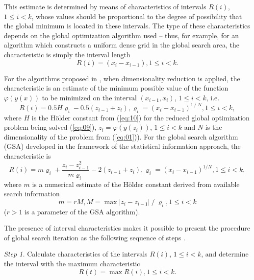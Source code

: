\documentclass[runningheads]{llncs}
\begin{document}
This estimate is determined by means of characteristics of intervals $R(i)$, $1 \leq i<k$, whose values should be proportional to the degree of possibility that the global minimum is located  in these intervals. The type of these characteristics depends on the global optimization algorithm used -- thus, for example, for an algorithm which constructs a uniform dense grid in the global search area, the characteristic is simply the interval length 
\begin{equation}
\label{eq:12}
R(i)=(x_i-x_{i-1}), 1 \leq i<k.
\end{equation}


For the algorithms proposed in \cite{c22,c23}, when dimensionality reduction is applied, the characteristic is an estimate of the minimum possible value of the function $\varphi(y(x))$ to be minimized on the interval $(x_{i-1},x_i )$, $1 \leq i < k$, i.e.
\begin{equation}
\label{eq:13}
R(i) = 0.5 H \varrho_i - 0.5 (z_{i-1} + z_i ), \varrho_i = (x_i-x_{i-1} ) ^ {1⁄N}, 1 \leq i < k,
\end{equation}
where $H$ is the H{\" o}lder constant from (\ref{eq:10}) for the reduced global optimization problem being solved (\ref{eq:09}), $z_i = \varphi(y(z_i))$, $1 \leq i < k$ and $N$ is the dimensionality of the problem from (\ref{eq:01})).  For the global search algorithm (GSA) \cite{c15,c24} developed in the framework of the statistical information approach, the characteristic is
\begin{equation}
\label{eq:14}
R(i)=m\varrho_i+\frac{z_i-z_{i-1}^2}{m\varrho_i}-2(z_{i-1}+z_i ),\varrho_i=(x_i-x_{i-1})^{1/N}, 1 \leq i < k,
\end{equation}
where $m$ is a numerical estimate of the H{\" o}lder constant derived from available search information
\begin{equation}
\label{eq:15}
m= r M, M = \max |z_i-z_{i-1} | ⁄ \varrho_i, 1 \leq i<k
\end{equation}
 ($r>1$ is a parameter of the GSA algorithm).

The presence of interval characteristics makes it possible to present the procedure of global search iteration as the following sequence of steps \cite{c15}.

\textit{Step 1.} Calculate characteristics of the  intervals $R(i)$, $1 \leq i < k$, and determine the interval with the maximum characteristic
\begin{equation}
\label{eq:16}
R(t) = \max R(i), 1\leq i < k.
\end{equation}
\end{document}
